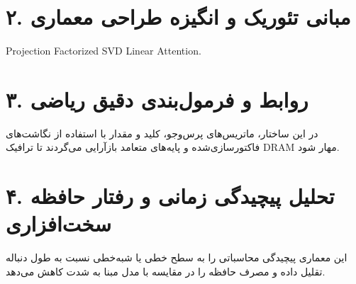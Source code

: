 \documentclass[12pt,a4paper]{article}
\begin{document}
\section*{۲. مبانی تئوریک و انگیزه طراحی معماری}
Projection Factorized SVD Linear Attention.

\section*{۳. روابط و فرمول‌بندی دقیق ریاضی}
در این ساختار، ماتریس‌های پرس‌وجو، کلید و مقدار با استفاده از نگاشت‌های فاکتورسازی‌شده و پایه‌های متعامد بازآرایی می‌گردند تا ترافیک DRAM مهار شود.

\section*{۴. تحلیل پیچیدگی زمانی و رفتار حافظه سخت‌افزاری}
این معماری پیچیدگی محاسباتی را به سطح خطی یا شبه‌خطی نسبت به طول دنباله تقلیل داده و مصرف حافظه را در مقایسه با مدل مبنا به شدت کاهش می‌دهد.
\end{document}
